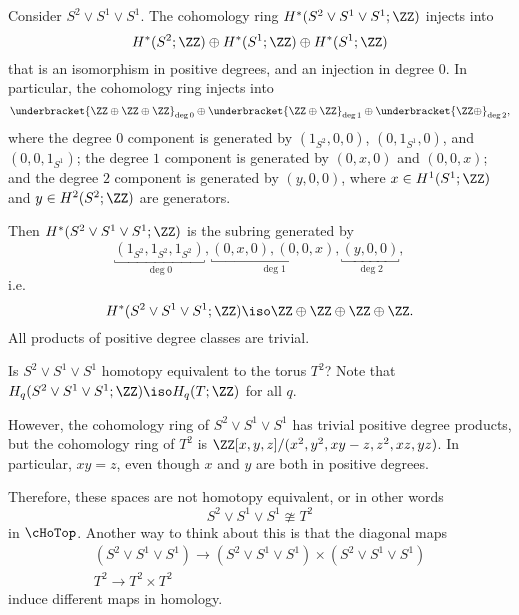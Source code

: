 \documentclass{standalone}
\begin{document}
\begin{example}
  Consider \(S^2 \vee S^1 \vee S^1\).
  The cohomology ring \(H^*(S^2 \vee S^1 \vee S^1; \ZZ)\) injects into
  \[
    H^*(S^2; \ZZ) \oplus
    H^*(S^1; \ZZ) \oplus
    H^*(S^1; \ZZ)
  \]
  that is an isomorphism in positive degrees,
  and an injection in degree \(0\).
  In particular, the cohomology ring injects into
  \[
    \underbracket{\ZZ \oplus \ZZ \oplus \ZZ}_{\deg 0} \oplus
    \underbracket{\ZZ \oplus \ZZ}_{\deg 1} \oplus
    \underbracket{\ZZ \oplus}_{\deg 2},
  \]
  where the degree \(0\) component is generated by
    \((1_{S^2}, 0, 0)\), \((0, 1_{S^1}, 0)\), and \((0, 0, 1_{S^1})\);
  the degree \(1\) component is generated by
    \((0, x, 0)\) and \((0, 0, x)\); and
  the degree \(2\) component is generated by
    \((y, 0, 0)\),
  where \(x \in H^1(S^1; \ZZ)\) and \(y \in H^2(S^2; \ZZ)\) are generators.

  Then \(H^*(S^2 \vee S^1 \vee S^1; \ZZ)\) is the subring generated by
  \[
    \underbracket{(1_{S^2}, 1_{S^2}, 1_{S^2})}_{\deg 0},
    \underbracket{(0, x, 0),
                  (0, 0, x)}_{\deg 1},
    \underbracket{(y, 0, 0)}_{\deg 2},
  \]
  i.e.\
  \[
    H^*(S^2 \vee S^1 \vee S^1; \ZZ)
      \iso \ZZ \oplus \ZZ \oplus \ZZ \oplus \ZZ.
  \]
  All products of positive degree classes are trivial.
\end{example}

\begin{question}
  Is \(S^2 \vee S^1 \vee S^1\) homotopy equivalent to the torus \(T^2\)?
  Note that \(H_q(S^2 \vee S^1 \vee S^1; \ZZ) \iso H_q(T; \ZZ)\)
  for all \(q\).

  However, the cohomology ring of \(S^2 \vee S^1 \vee S^1\)
  has trivial positive degree products,
  but the cohomology ring of \(T^2\) is
  \(\ZZ[x, y, z]/(x^2, y^2, xy-z, z^2, xz, yz)\).
  In particular, \(xy = z\), even though \(x\) and \(y\) are both
  in positive degrees.

  Therefore, these spaces are not homotopy equivalent, or in other words
  \[
    S^2 \vee S^1 \vee S^1 \ncong T^2
  \]
  in \(\cHoTop\).
  Another way to think about this is that the diagonal maps
  \begin{gather*}
    (S^2 \vee S^1 \vee S^1) \to
      (S^2 \vee S^1 \vee S^1) \times (S^2 \vee S^1 \vee S^1) \\
    T^2 \to T^2 \times T^2
  \end{gather*}
  induce different maps in homology.
\end{question}
\end{document}

